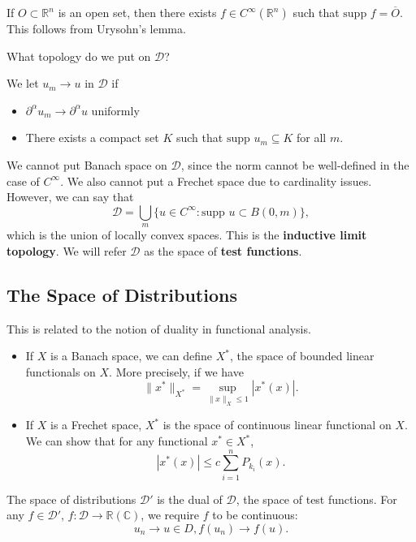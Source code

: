 \documentclass[12pt]{scrartcl}
\newcommand{\R}{\mathbb{R}}
\newcommand{\C}{\mathbb C}
\newcommand{\supp}{\text{supp }}
\begin{document}
\begin{fact} If $O \subset \R^n$ is an open set, then there exists $f \in C^{\infty}(\R^n)$ such that $\supp f = \overline{O}$. This follows from Urysohn's lemma.
\end{fact}

What topology do we put on $\mathcal{D}$?  

\begin{definition} We let $u_m \rightarrow u$ in $\mathcal D$ if 
\begin{itemize}
\item $\partial^\alpha u_m \rightarrow \partial^\alpha u$ uniformly
\item There exists a compact set $K$ such that $\supp u_m\subseteq K$ for all $m$.
\end{itemize}
\end{definition}

We cannot put Banach space on $\mathcal D$, since the norm cannot be well-defined in the case of $C^{\infty}$.  We also cannot put a Frechet space due to cardinality issues.  However, we can say that
$$\mathcal D = \bigcup_m \{u \in C^{\infty}: \supp u \subset B(0, m)\},$$
which is the union of locally convex spaces.  This is the \textbf{inductive limit topology}.  We will refer $\mathcal D$ as the space of \textbf{test functions}.

\subsection{The Space of Distributions}
This is related to the notion of duality in functional analysis. 

\begin{itemize}
 \item If $X$ is a Banach space, we can define $X^*$, the space of bounded linear functionals on $X$.  More precisely, if we have $$\|x^*\|_{X^*} = \sup_{\|x\|_X \le 1} |x^*(x)|.$$
 \item If $X$ is a Frechet space, $X^*$ is the space of continuous linear functional on $X$.  We can show that for any functional $x^* \in X^*$,
 $$|x^*(x)| \le c \sum_{i=1}^n P_{k_i}(x).$$
 \end{itemize} 
\begin{definition} The space of distributions $\mathcal D'$ is the dual of $\mathcal D$, the space of test functions.  For any $f \in \mathcal D'$, $f : \mathcal D \rightarrow \R(\C)$, we require $f$ to be continuous:
$$u_n \rightarrow u \in D, f(u_n) \rightarrow f(u).$$
\end{definition}
\end{document}
